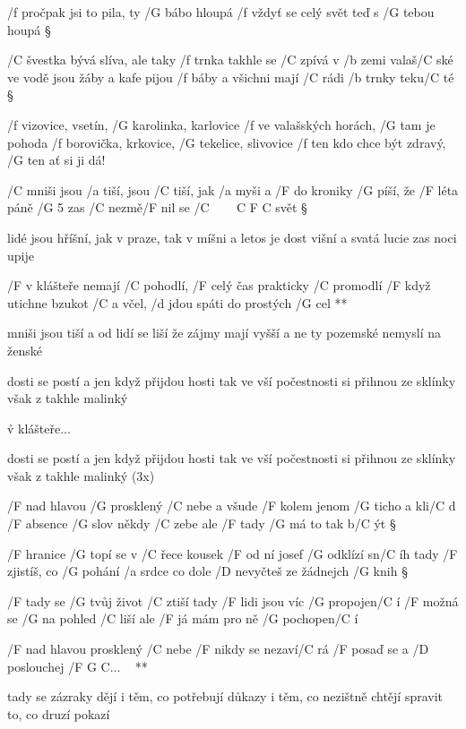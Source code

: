 /f pročpak jsi to pila, ty /G bábo hloupá
/f vždyť se celý svět teď s /G tebou houpá \S

/C švestka bývá slíva, ale taky /f trnka
takhle se /C zpívá v /b zemi valaš/C ské
ve vodě jsou žáby a kafe pijou /f báby
a všichni mají /C rádi /b trnky teku/C té \S

/f vizovice, vsetín, /G karolinka, karlovice
/f ve valašských horách, /G tam je pohoda
/f borovička, krkovice, /G tekelice, slivovice
/f ten kdo chce být zdravý, /G ten ať si ji dá!




/C mniši jsou /a tiší, jsou /C tiší, jak /a myši
a /F do kroniky /G píší, že /F léta páně /G 5
zas /C nezmě/F nil se /{C ~~~ C F C} svět \S

lidé jsou hříšní, jak v praze, tak v míšni
a letos je dost višní a svatá lucie zas noci upije

\R  /F v klášteře nemají /C pohodlí, /F celý čas prakticky /C promodlí
    /F když utichne bzukot /{C a} včel, /d jdou spáti do prostých /G cel **

mniši jsou tiší a od lidí se liší
že zájmy mají vyšší a ne ty pozemské
nemyslí na ženské \s

dosti se postí a jen když přijdou hosti
tak ve vší počestnosti si přihnou ze sklínky
však z takhle malinký

\r v klášteře...

dosti se postí a jen když přijdou hosti
tak ve vší počestnosti si přihnou ze sklínky
však z takhle malinký (3x)




/F nad hlavou /G prosklený /C nebe
a všude /F kolem jenom /G ticho a kli/C d
/F absence /G slov někdy /C zebe
ale /F tady /G má to tak b/C ýt \S

/F hranice /G topí se v /C řece
kousek /F od ní josef /G odklízí sn/C íh
tady /F zjistíš, co /G pohání /a srdce
co dole /D nevyčteš ze žádnejch /G knih \S

/F tady se /G tvůj život /C ztiší
tady /F lidi jsou víc /G propojen/C í
/F možná se /G na pohled /C liší
ale /F já mám pro ně /G pochopen/C í

\R  /F nad hlavou prosklený /C nebe
    /F nikdy se nezaví/C rá
    /F posaď se a /D poslouchej /{F G C...} ~ **

tady se zázraky dějí
i těm, co potřebují důkazy
i těm, co nezištně chtějí
spravit to, co druzí pokazí \s


